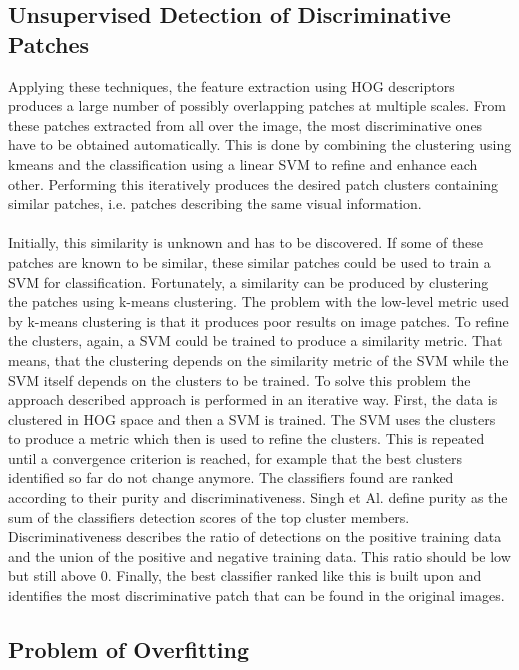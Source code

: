 \subsection{Unsupervised Detection of Discriminative Patches}

Applying these techniques, the feature extraction using HOG descriptors produces a large number of possibly overlapping patches at multiple scales. From these patches extracted from all over the image, the most discriminative ones have to be obtained automatically. This is done by combining the clustering using kmeans and the classification using a linear SVM to refine and enhance each other. Performing this iteratively produces the desired patch clusters containing similar patches, i.e. patches describing the same visual information. 
\\
\\
Initially, this similarity is unknown and has to be discovered. If some of these patches are known to be similar, these similar patches could be used to train a SVM for classification. Fortunately, a similarity can be produced by clustering the patches using k-means clustering. The problem with the low-level metric used by k-means clustering is that it produces poor results on image patches. To refine the clusters, again, a SVM could be trained to produce a similarity metric. That means, that the clustering depends on the similarity metric of the SVM while the SVM itself depends on the clusters to be trained. To solve this problem the approach described approach is performed in an iterative way. First, the data is clustered in HOG space and then a SVM is trained. The SVM uses the clusters to produce a metric which then is used to refine the clusters. This is repeated until a convergence criterion is reached, for example that the best clusters identified so far do not change anymore. The classifiers found are ranked according to their purity and discriminativeness. Singh et Al. \cite{Singh2012DiscPat} define purity as the sum of the classifiers detection scores of the top cluster members. Discriminativeness describes the ratio of detections on the positive training data and the union of the positive and negative training data. This ratio should be low but still above 0. Finally, the best classifier ranked like this is built upon and identifies the most discriminative patch that can be found in the original images.

\subsection{Problem of Overfitting}

